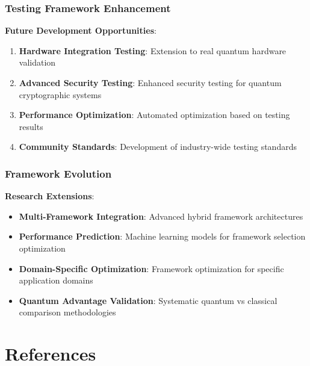 \documentclass[12pt,a4paper]{article}
\begin{document}
\subsubsection{Testing Framework Enhancement}

\textbf{Future Development Opportunities}:
\begin{enumerate}
\item \textbf{Hardware Integration Testing}: Extension to real quantum hardware validation
\item \textbf{Advanced Security Testing}: Enhanced security testing for quantum cryptographic systems
\item \textbf{Performance Optimization}: Automated optimization based on testing results
\item \textbf{Community Standards}: Development of industry-wide testing standards
\end{enumerate}

\subsubsection{Framework Evolution}

\textbf{Research Extensions}:
\begin{itemize}
\item \textbf{Multi-Framework Integration}: Advanced hybrid framework architectures
\item \textbf{Performance Prediction}: Machine learning models for framework selection optimization
\item \textbf{Domain-Specific Optimization}: Framework optimization for specific application domains
\item \textbf{Quantum Advantage Validation}: Systematic quantum vs classical comparison methodologies
\end{itemize}

\section{References}
\end{document}
